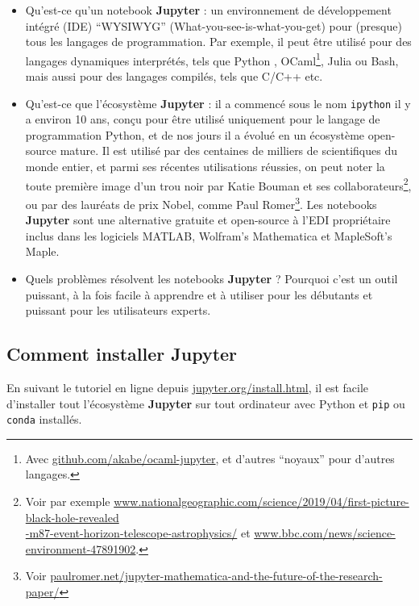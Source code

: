 \documentclass[runningheads]{llncs}
\newcommand{\Jupyter}{\textbf{Jupyter}}
\begin{document}
\begin{itemize}
    \item Qu'est-ce qu'un notebook \Jupyter{} : un environnement de développement intégré (IDE) ``WYSIWYG'' (What-you-see-is-what-you-get) pour (presque) tous les langages de programmation. Par exemple, il peut être utilisé pour des langages dynamiques interprétés, tels que Python \cite{python}, OCaml\footnote{Avec \url{github.com/akabe/ocaml-jupyter}, et d'autres ``noyaux'' pour d'autres langages.}, Julia ou Bash, mais aussi pour des langages compilés, tels que C/C++ etc.

    \item Qu'est-ce que l'écosystème \Jupyter{} : il a commencé sous le nom \texttt{ipython} \cite{ipython} il y a environ 10 ans, conçu pour être utilisé uniquement pour le langage de programmation Python, et de nos jours il a évolué en un écosystème open-source mature.
    Il est utilisé par des centaines de milliers de scientifiques du monde entier, et parmi ses récentes utilisations réussies, on peut noter la toute première image d'un trou noir par Katie Bouman et ses collaborateurs\footnote{Voir par exemple \url{www.nationalgeographic.com/science/2019/04/first-picture-black-hole-revealed}\\\url{-m87-event-horizon-telescope-astrophysics/} et \url{www.bbc.com/news/science-environment-47891902}.}, ou par des lauréats de prix Nobel, comme Paul Romer\footnote{Voir \url{paulromer.net/jupyter-mathematica-and-the-future-of-the-research-paper/}}.
    Les notebooks \Jupyter{} sont une alternative gratuite et open-source à l'EDI propriétaire inclus dans les logiciels MATLAB, Wolfram's Mathematica et MapleSoft's Maple.

    \item Quels problèmes résolvent les notebooks \Jupyter{} ? Pourquoi c'est un outil puissant, à la fois facile à apprendre et à utiliser pour les débutants et puissant pour les utilisateurs experts.
\end{itemize}



\subsection*{Comment installer \Jupyter{}}

En suivant le tutoriel en ligne depuis \url{jupyter.org/install.html}, il est facile d'installer tout l'écosystème \Jupyter{} sur tout ordinateur avec Python et \texttt{pip} ou \texttt{conda} installés.
\end{document}

